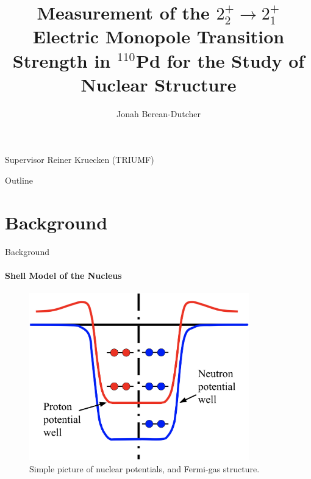 \documentclass{beamer}
\title[Your Short Title]{Measurement of the $2^+_2 \rightarrow 2^+_1$ Electric Monopole Transition Strength in $^{110}$Pd for the Study of Nuclear Structure}
\author{Jonah Berean-Dutcher}
\institute{Department of Physics and Astronomy \newline University of British Columbia}
\begin{document}


\begin{frame}
  \titlepage
  \begin{block}{Supervisor}
  Reiner Kruecken (TRIUMF)
  \end{block}
\end{frame}



\begin{frame}{Outline}
 \let\clearpage\relax
 \tableofcontents
\end{frame}



\section{Background}



\begin{frame}{Background}
\framesubtitle{Shell Model of the Nucleus}
\begin{figure}[!hht]
  \centering
  \includegraphics[width=0.85\textwidth, keepaspectratio]{FermiFinal.png}
  \caption{Simple picture of nuclear potentials, and Fermi-gas structure.}
  \label{ShellFermi}
\end{figure}
\end{frame}


\end{document}
